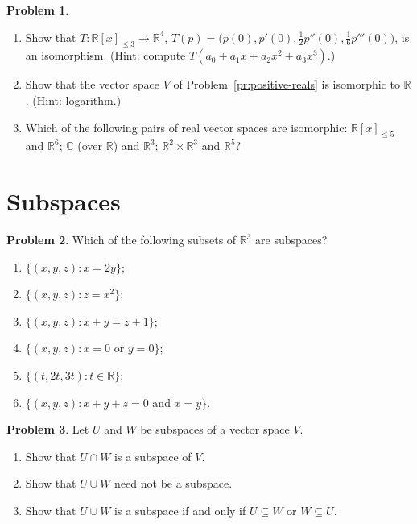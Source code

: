 \documentclass[11pt]{article}
\theoremstyle{definition}
\newtheorem{problem}{Problem}[section]
\begin{document}
\begin{problem}\label{pr:iso}
    \begin{enumerate}[label=(\alph*)]
        \item Show that $T: \mathbb{R}[x]_{\leq 3} \to \mathbb{R}^4$, $T(p) = \big(p(0), p'(0), \frac{1}{2}p''(0), \frac{1}{6}p'''(0)\big)$, is an isomorphism. (Hint: compute $T(a_0 + a_1 x + a_2 x^2 + a_3 x^3)$.)
        \item Show that the vector space $V$ of Problem~\ref{pr:positive-reals} is isomorphic to $\mathbb{R}$. (Hint: logarithm.)
        \item Which of the following pairs of real vector spaces are isomorphic: $\mathbb{R}[x]_{\leq 5}$ and $\mathbb{R}^6$; $\mathbb{C}$ (over $\mathbb{R}$) and $\mathbb{R}^3$; $\mathbb{R}^2 \times \mathbb{R}^3$ and $\mathbb{R}^5$?
    \end{enumerate}
\end{problem}

\section{Subspaces}

\begin{problem}\label{pr:subspaces}
    Which of the following subsets of $\mathbb{R}^3$ are subspaces?
    \begin{enumerate}[label=(\alph*)]
        \item $\{(x, y, z) : x = 2y\}$;
        \item $\{(x, y, z) : z = x^2\}$;
        \item $\{(x, y, z) : x + y = z + 1\}$;
        \item $\{(x, y, z) : x = 0 \text{ or } y = 0\}$;
        \item $\{(t, 2t, 3t) : t \in \mathbb{R}\}$;
        \item $\{(x, y, z) : x + y + z = 0 \text{ and } x = y\}$.
    \end{enumerate}
\end{problem}

\begin{problem}\label{pr:intersection}
    Let $U$ and $W$ be subspaces of a vector space $V$.
    \begin{enumerate}[label=(\alph*)]
        \item Show that $U \cap W$ is a subspace of $V$.
        \item Show that $U \cup W$ need not be a subspace.
        \item Show that $U \cup W$ is a subspace if and only if $U \subseteq W$ or $W \subseteq U$.
    \end{enumerate}
\end{problem}
\end{document}
